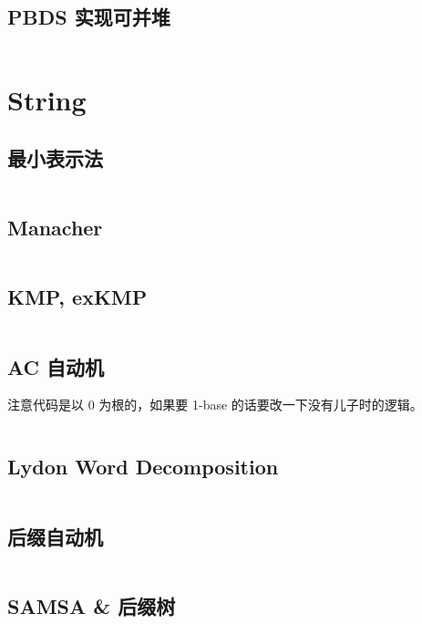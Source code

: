 \documentclass[titlepage, a4paper, 11pt]{article}
\begin{document}
\begin{spacing}{1.15}
				\subsection{PBDS 实现可并堆}
					\inputminted{cpp}{src/DataStructure/pbds_heap.cpp}
			
			\section{String}
				\subsection{最小表示法}
					\inputminted{cpp}{src/String/最小表示法.cpp}
				\subsection{Manacher}
					\inputminted{cpp}{src/String/Manacher.cpp}
				\subsection{KMP, exKMP}
					\inputminted{cpp}{src/String/KMP.cpp}
				\subsection{AC 自动机}
					注意代码是以 0 为根的，如果要 1-base 的话要改一下没有儿子时的逻辑。
					\inputminted{cpp}{src/String/AC 自动机.cpp}
				\subsection{Lydon Word Decomposition}
					\inputminted{cpp}{src/String/Lyndon Word.cpp}
				\subsection{后缀自动机}
					\inputminted{cpp}{src/String/SAM.cpp}
				\subsection{SAMSA \& 后缀树}
					\inputminted{cpp}{src/String/SAMSA.cpp}

\end{spacing}
\end{document}
